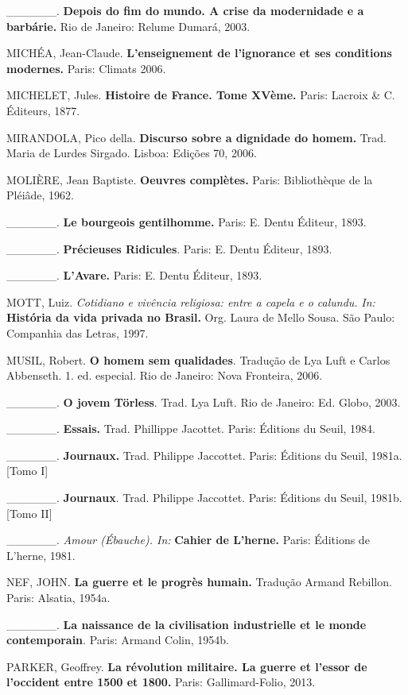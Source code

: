 \_\_\_\_\_\_. \textbf{Depois do fim do mundo. A crise da modernidade e a
barbárie.} Rio de Janeiro: Relume Dumará, 2003.

MICHÉA, Jean-Claude. \textbf{L'enseignement de l'ignorance et ses
conditions modernes.} Paris: Climats 2006.

MICHELET, Jules. \textbf{Histoire de France. Tome XVème.} Paris: Lacroix
\& C. Éditeurs, 1877.

MIRANDOLA, Pico della. \textbf{Discurso sobre a dignidade do homem.}
Trad. Maria de Lurdes Sirgado. Lisboa: Edições 70, 2006.

MOLIÈRE, Jean Baptiste. \textbf{Oeuvres complètes.} Paris: Bibliothèque
de la Pléiâde, 1962.

\_\_\_\_\_\_. \textbf{Le bourgeois gentilhomme.} Paris: E. Dentu
Éditeur, 1893.

\_\_\_\_\_\_. \textbf{Précieuses Ridicules}. Paris: E. Dentu Éditeur,
1893.

\_\_\_\_\_\_. \textbf{L'Avare.} Paris: E. Dentu Éditeur, 1893.

MOTT, Luiz. \emph{Cotidiano e vivência religiosa: entre a capela e o
calundu.} \emph{In:} \textbf{História da vida privada no Brasil.} Org.
Laura de Mello Sousa. São Paulo: Companhia das Letras, 1997.

MUSIL, Robert. \textbf{O homem sem qualidades}. Tradução de Lya Luft e
Carlos Abbenseth. 1. ed. especial. Rio de Janeiro: Nova Fronteira, 2006.

\_\_\_\_\_\_. \textbf{O jovem Törless}. Trad. Lya Luft. Rio de Janeiro:
Ed. Globo, 2003.

\_\_\_\_\_\_. \textbf{Essais.} Trad. Phillippe Jacottet. Paris: Éditions
du Seuil, 1984.

\_\_\_\_\_\_. \textbf{Journaux.} Trad. Philippe Jaccottet. Paris:
Éditions du Seuil, 1981a. {[}Tomo I{]}

\_\_\_\_\_\_. \textbf{Journaux}. Trad. Philippe Jaccottet. Paris:
Éditions du Seuil, 1981b. {[}Tomo II{]}

\_\_\_\_\_\_. \emph{Amour (Ébauche). In:} \textbf{Cahier de L'herne.}
Paris: Éditions de L'herne, 1981.

NEF, JOHN. \textbf{La guerre et le progrès humain.} Tradução Armand
Rebillon. Paris: Alsatia, 1954a.

\_\_\_\_\_\_. \textbf{La naissance de la civilisation industrielle et le
monde contemporain}. Paris: Armand Colin, 1954b.

PARKER, Geoffrey. \textbf{La révolution militaire. La guerre et l'essor
de l'occident entre 1500 et 1800.} Paris: Gallimard-Folio, 2013.

